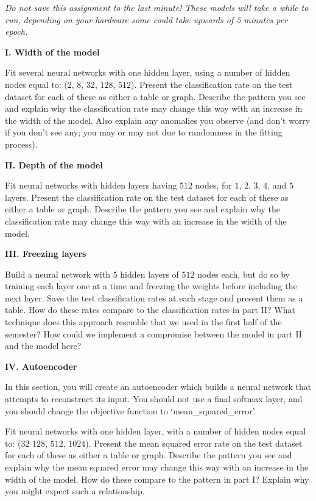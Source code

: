 \documentclass[12pt]{article}
\begin{document}
\textit{Do not save this assignment to the last minute! These models will
take a while to run, depending on your hardware some could take upwards of
5 minutes per epoch.}

\textbf{I. Width of the model}

Fit several neural networks with one hidden layer, using a number of hidden
nodes equal to: ($2$, $8$, $32$, $128$, $512$).
Present the classification rate on the test dataset for each of these as
either a table or graph.
Describe the pattern you see and explain why the classification rate may
change this way with an increase in the width of the model. Also explain
any anomalies you observe (and don't worry if you don't see any; you may
or may not due to randomness in the fitting process).

\textbf{II. Depth of the model}

Fit neural networks with hidden layers having
$512$ nodes, for $1$, $2$, $3$, $4$, and $5$ layers. Present the
classification rate on the test dataset for each of these as either
a table or graph. Describe the pattern you see and explain why the
classification rate may change this way with an increase in the
width of the model.

\textbf{III. Freezing layers}

Build a neural network with $5$ hidden layers of $512$ nodes each, but
do so by training each layer one at a time and freezing the weights before
including the next layer. Save the test classification rates at each stage
and present them as a table. How do these rates compare to the classification
rates in part II? What technique does this approach resemble that we used
in the first half of the semester? How could we implement a compromise between
the model in part II and the model here?

\textbf{IV. Autoencoder}

In this section, you will create an autoencoder which builds a neural network
that attempts to reconstruct its input. You should not use a final softmax layer,
and you should change the objective function to `mean\_squared\_error'.

Fit neural networks with one hidden layer, with a number of hidden
nodes equal to: ($32$ $128$, $512$, $1024$). Present the mean squared error
rate on the test dataset for each of these as either a table or graph.
Describe the pattern you see and explain why the mean squared error may
change this way with an increase in the width of the model. How do these
compare to the pattern in part I? Explain why you might expect such a relationship.
\end{document}
